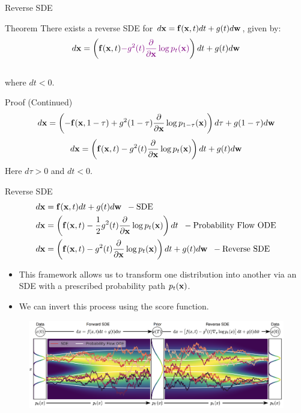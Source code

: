 \documentclass{beamer}
\begin{document}
\begin{frame}{Reverse SDE}
	\begin{block}{Theorem}
		There exists a reverse SDE for $d\mathbf{x} = \mathbf{f}(\mathbf{x}, t) dt + g(t) d \mathbf{w}$, given by:
		\vspace{-0.3cm}
		\[
			d\mathbf{x} = \left(\mathbf{f}(\mathbf{x}, t) {\color{violet}- g^2(t) \frac{\partial}{\partial \mathbf{x}}\log p_t(\mathbf{x})}\right) dt + g(t) d \mathbf{w}
		\]
		\vspace{-0.5cm}\\
		where $dt<0$.
	\end{block}
	\begin{block}{Proof (Continued)}
		\vspace{-0.7cm}
		\[
			d\mathbf{x} = \left(-\mathbf{f}(\mathbf{x}, 1 - \tau) + g^2(1 - \tau) \frac{\partial}{\partial \mathbf{x}} \log p_{1 - \tau}(\mathbf{x}) \right)d\tau + g(1 - \tau) d \mathbf{w}
		\]
		\eqpause
		\[
			d\mathbf{x} = \left(\mathbf{f}(\mathbf{x}, t) - g^2(t) \frac{\partial}{\partial \mathbf{x}}\log p_t(\mathbf{x})\right)dt + g(t) d\mathbf{w}
		\]
		Here $d\tau > 0$ and $dt < 0$.
	\end{block}
\end{frame}
\begin{frame}{Reverse SDE}
	\vspace{-0.3cm}
	\begin{align*}
		d\mathbf{x} &= \mathbf{f}(\mathbf{x}, t) dt + g(t) d \mathbf{w} \;\; - \text{SDE} \\
		d\mathbf{x} &= \left(\mathbf{f}(\mathbf{x}, t) -\frac{1}{2} g^2(t) \frac{\partial}{\partial \mathbf{x}} \log p_t(\mathbf{x}) \right) dt \;\; - \text{Probability Flow ODE} \\
		d\mathbf{x} &= \left(\mathbf{f}(\mathbf{x}, t) - g^2(t) \frac{\partial}{\partial \mathbf{x}}\log p_t(\mathbf{x})\right) dt + g(t) d \mathbf{w} \;\; - \text{Reverse SDE}
	\end{align*}
	\eqpause
	\vspace{-0.7cm}
	\begin{itemize}
		\item This framework allows us to transform one distribution into another via an SDE with a prescribed probability path $p_t(\mathbf{x})$.
		\item We can invert this process using the score function.
	\end{itemize}
	\vspace{-0.3cm}
	\begin{figure}
		\includegraphics[width=0.9\linewidth]{figs/sde}
	\end{figure}
\end{frame}
\end{document}
